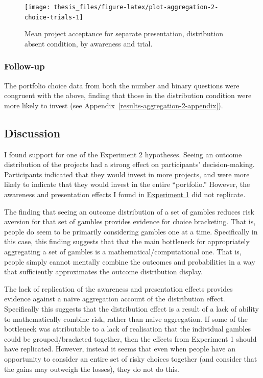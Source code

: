 \documentclass[a4paper, nobind, dvipsnames]{templates/ociamthesis}
\theoremstyle{definition}
\theoremstyle{definition}
\theoremstyle{definition}
\theoremstyle{definition}
\theoremstyle{remark}
\begin{document}
\begin{figure}
\texttt{[image: thesis\_files/figure-latex/plot-aggregation-2-choice-trials-1]} \caption{Mean project acceptance for separate presentation, distribution absent condition, by awareness and trial.}\label{fig:plot-aggregation-2-choice-trials}
\end{figure}

\subsubsection{Follow-up}

The portfolio choice data from both the number and binary questions were
congruent with the above, finding that those in the distribution condition were
more likely to invest (see Appendix~\ref{results-aggregation-2-appendix}).

\hypertarget{discussion-aggregation-4}{%
\subsection{Discussion}\label{discussion-aggregation-4}}

I found support for one of the Experiment 2 hypotheses. Seeing an outcome
distribution of the projects had a strong effect on participants'
decision-making. Participants indicated that they would invest in more projects,
and were more likely to indicate that they would invest in the entire
``portfolio.'' However, the awareness and presentation effects I found in
\protect\hyperlink{results-aggregation-1}{Experiment 1} did not replicate.

The finding that seeing an outcome distribution of a set of gambles reduces risk
aversion for that set of gambles provides evidence for choice bracketing. That
is, people do seem to be primarily considering gambles one at a time.
Specifically in this case, this finding suggests that that the main bottleneck
for appropriately aggregating a set of gambles is a mathematical/computational
one. That is, people simply cannot mentally combine the outcomes and
probabilities in a way that sufficiently approximates the outcome distribution
display.

The lack of replication of the awareness and presentation effects provides
evidence against a naive aggregation account of the distribution effect.
Specifically this suggests that the distribution effect is a result of a lack of
ability to mathematically combine risk, rather than naive aggregation. If some
of the bottleneck was attributable to a lack of realisation that the individual
gambles could be grouped/bracketed together, then the effects from Experiment 1
should have replicated. However, instead it seems that even when people have an
opportunity to consider an entire set of risky choices together (and consider
that the gains may outweigh the losses), they do not do this.
\end{document}
